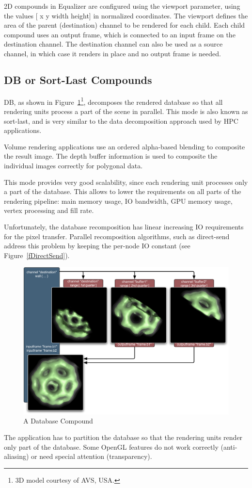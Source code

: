 \documentclass[10pt,a4]{scrartcl}
\newcommand{\fig}[1]{Figure~\ref{#1}}
\begin{document}
2D compounds in Equalizer are configured using the \textsf{viewport}
parameter, using the values \textsf{[ x y width height]} in normalized
coordinates. The viewport defines the area of the parent (destination)
channel to be rendered for each child. Each child compound uses an
output frame, which is connected to an input frame on the destination
channel. The destination channel can also be used as a source channel,
in which case it renders in place and no output frame is needed.

\subsection{DB or Sort-Last Compounds}

DB, as shown in \fig{fDB}\footnote{3D model courtesy of AVS, USA.},
decomposes the rendered database so that all rendering units process a
part of the scene in parallel. This mode is also known as sort-last, and
is very similar to the data decomposition approach used by HPC
applications.

Volume rendering applications use an ordered alpha-based blending to
composite the result image. The depth buffer information is used to
composite the individual images correctly for polygonal data. 

This mode provides very good scalability, since each rendering unit
processes only a part of the database. This allows to lower the
requirements on all parts of the rendering pipeline: main memory usage,
IO bandwidth, GPU memory usage, vertex processing and fill rate.

Unfortunately, the database recomposition has linear increasing IO
requirements for the pixel transfer. Parallel recomposition algorithms,
such as direct-send address this problem by keeping the per-node IO
constant (see \fig{fDirectSend}).

\begin{figure}
  \includegraphics[width=.618\textwidth]{images/DB.pdf}
  {\caption{\label{fDB}\small A Database Compound}}
\end{figure}
The application has to partition the database so that the rendering units
render only part of the database. Some OpenGL features do not work
correctly (anti-aliasing) or need special attention (transparency).
\end{document}
